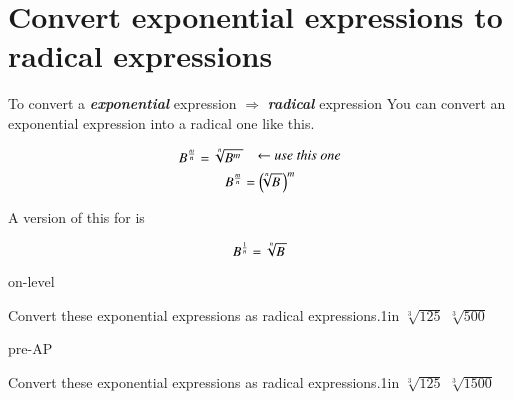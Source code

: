 \section*{Convert exponential expressions to radical expressions}
%
\begin{myConcept}{%
        To convert 
        a {\bfseries\itshape exponential} expression 
        $\Longrightarrow$
        {\bfseries\itshape radical} expression%
    }%
    You can convert an exponential expression into a radical one like this.
    \begin{myCenteredBox}[width=3in]
        \Large
        \[
            B ^ {\frac{m}{n}}
            =
            \myRoot[n]{B^m} \raisebox{0.2em}{\text{\normalsize\itshape\quad $\leftarrow$ use this one}}
        \]
        \[
            B ^ {\frac{m}{n}}
            =
            \left(\hspace{-0.25em} \myRoot[n]{B} \right)^m
        \]
    \end{myCenteredBox}
    A version of this for  is
    \begin{myCenteredBox}[width=3in]
        \Large
        \[
            B ^ {\frac{1}{n}}
            =
            \myRoot[n]{B}
        \]
    \end{myCenteredBox}
\end{myConcept}




\begin{taggedblock}{on-level}
    \begin{myProblems2}{Convert these exponential expressions as radical expressions.}{1in}
        {
            $\sqrt[3]{125}$ 
        }
        {
            $\sqrt[3]{500}$ 
        }
    \end{myProblems2}
\end{taggedblock}
\begin{taggedblock}{pre-AP}
    \begin{myProblems2}{Convert these exponential expressions as radical expressions.}{1in}
        {
            $\sqrt[3]{125}$ 
        }
        {
            $\sqrt[3]{1500}$ 
        }
    \end{myProblems2}
\end{taggedblock}


